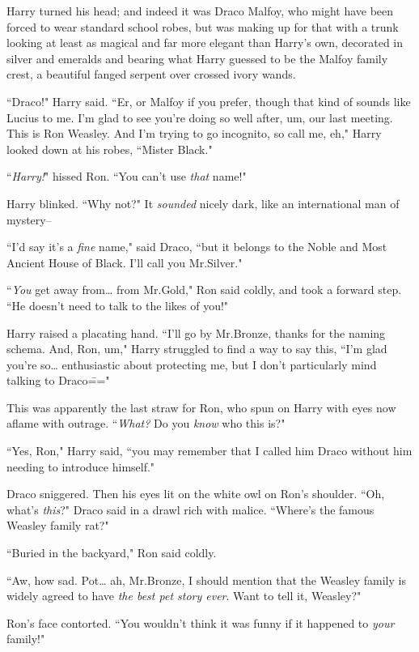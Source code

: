 Harry turned his head; and indeed it was Draco Malfoy, who might have been forced to wear standard school robes, but was making up for that with a trunk looking at least as magical and far more elegant than Harry's own, decorated in silver and emeralds and bearing what Harry guessed to be the Malfoy family crest, a beautiful fanged serpent over crossed ivory wands.

``Draco!" Harry said. ``Er, or Malfoy if you prefer, though that kind of sounds like Lucius to me. I'm glad to see you're doing so well after, um, our last meeting. This is Ron Weasley. And I'm trying to go incognito, so call me, eh," Harry looked down at his robes, ``Mister Black."

``\emph{Harry!}" hissed Ron. ``You can't use \emph{that} name!"

Harry blinked. ``Why not?" It \emph{sounded} nicely dark, like an international man of mystery\---

``I'd say it's a \emph{fine} name," said Draco, ``but it belongs to the Noble and Most Ancient House of Black. I'll call you Mr.\?Silver."

``\emph{You} get away from{\ldots} from Mr.\?Gold," Ron said coldly, and took a forward step. ``He doesn't need to talk to the likes of you!"

Harry raised a placating hand. ``I'll go by Mr.\?Bronze, thanks for the naming schema. And, Ron, um," Harry struggled to find a way to say this, ``I'm glad you're so{\ldots} enthusiastic about protecting me, but I don't particularly mind talking to Draco\==="

This was apparently the last straw for Ron, who spun on Harry with eyes now aflame with outrage. ``\emph{What?} Do you \emph{know} who this is?"

``Yes, Ron," Harry said, ``you may remember that I called him Draco without him needing to introduce himself."

Draco sniggered. Then his eyes lit on the white owl on Ron's shoulder. ``Oh, what's \emph{this}?" Draco said in a drawl rich with malice. ``Where's the famous Weasley family rat?"

``Buried in the backyard," Ron said coldly.

``Aw, how sad. Pot{\ldots} ah, Mr.\?Bronze, I should mention that the Weasley family is widely agreed to have \emph{the best pet story ever}. Want to tell it, Weasley?"

Ron's face contorted. ``You wouldn't think it was funny if it happened to \emph{your} family!"

